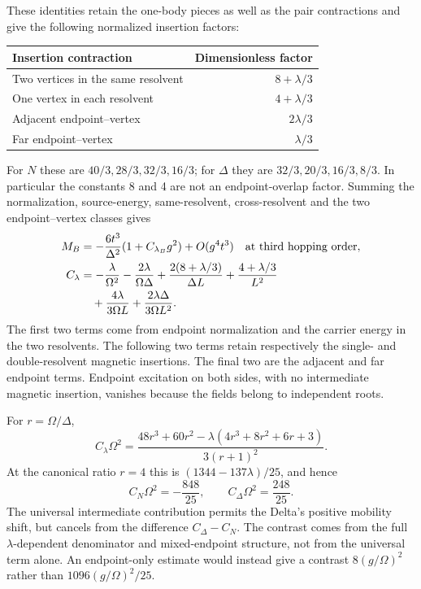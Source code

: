 \documentclass[11pt]{article}
\begin{document}
These identities retain the one-body pieces as well as the pair contractions and give the following normalized insertion factors:
\begin{center}
\begin{tabular}{lr}
\toprule
Insertion contraction & Dimensionless factor\\\midrule
Two vertices in the same resolvent & $8+\lambda/3$\\
One vertex in each resolvent & $4+\lambda/3$\\
Adjacent endpoint--vertex & $2\lambda/3$\\
Far endpoint--vertex & $\lambda/3$\\\bottomrule
\end{tabular}
\end{center}
For $N$ these are $40/3,28/3,32/3,16/3$; for $\Delta$ they are $32/3,20/3,16/3,8/3$. In particular the constants 8 and 4 are not an endpoint-overlap factor. Summing the normalization, source-energy, same-resolvent, cross-resolvent and the two endpoint--vertex classes gives
\begin{align}
 M_B&=-\frac{6t^3}{\Delta^2}(1+C_{\lambda_B}g^2)+O(g^4t^3)\quad\text{at third hopping order},\\
 C_\lambda&=-\frac{\lambda}{\Omega^2}-\frac{2\lambda}{\Omega\Delta}
 +\frac{2(8+\lambda/3)}{\Delta L}+\frac{4+\lambda/3}{L^2}\notag\\
 &\quad+\frac{4\lambda}{3\Omega L}+\frac{2\lambda\Delta}{3\Omega L^2}. \label{eq:C}
\end{align}
The first two terms come from endpoint normalization and the carrier energy in the two resolvents. The following two terms retain respectively the single- and double-resolvent magnetic insertions. The final two are the adjacent and far endpoint terms. Endpoint excitation on both sides, with no intermediate magnetic insertion, vanishes because the fields belong to independent roots.

For $r=\Omega/\Delta$,
\begin{equation}
 C_\lambda\Omega^2=
 \frac{48r^3+60r^2-\lambda(4r^3+8r^2+6r+3)}{3(r+1)^2}.
\end{equation}
At the canonical ratio $r=4$ this is $(1344-137\lambda)/25$, and hence
\begin{equation}
 C_N\Omega^2=-\frac{848}{25},\qquad
 C_\Delta\Omega^2=\frac{248}{25}. \label{eq:coefficients}
\end{equation}
The universal intermediate contribution permits the Delta's positive mobility shift, but cancels from the difference $C_\Delta-C_N$. The contrast comes from the full $\lambda$-dependent denominator and mixed-endpoint structure, not from the universal term alone. An endpoint-only estimate would instead give a contrast $8(g/\Omega)^2$ rather than $1096(g/\Omega)^2/25$.
\end{document}
